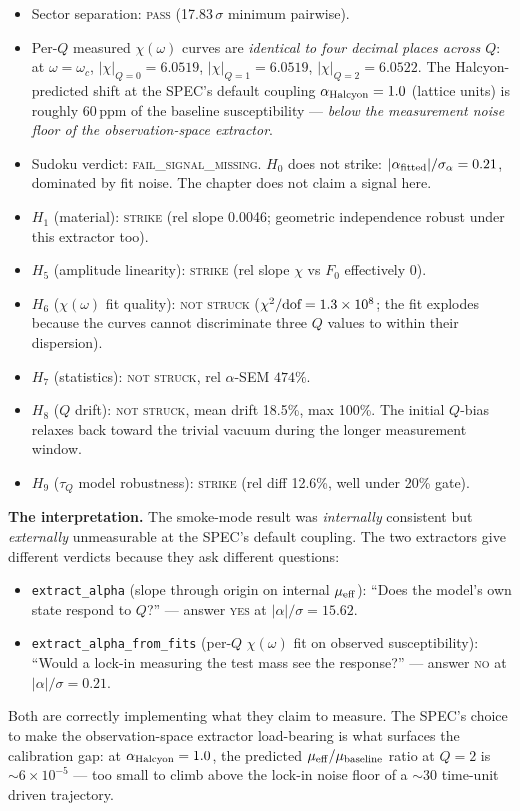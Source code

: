 \documentclass[12pt,a4paper]{article}
\theoremstyle{plain}
\theoremstyle{definition}
\theoremstyle{remark}
\begin{document}
\begin{itemize}
    \item Sector separation: \textsc{pass} (17.83\,$\sigma$ minimum pairwise).
    \item Per-$Q$ measured $\chi(\omega)$ curves are \emph{identical to four decimal places across $Q$}: at $\omega = \omega_c$, $|\chi|_{Q=0} = 6.0519$, $|\chi|_{Q=1} = 6.0519$, $|\chi|_{Q=2} = 6.0522$. The Halcyon-predicted shift at the SPEC's default coupling $\alpha_{\rm Halcyon} = 1.0$ (lattice units) is roughly $60\,$ppm of the baseline susceptibility --- \emph{below the measurement noise floor of the observation-space extractor}.
    \item Sudoku verdict: \textsc{fail\_signal\_missing}. $H_0$ does not strike: $|\alpha_{\rm fitted}|/\sigma_\alpha = 0.21$, dominated by fit noise. The chapter does not claim a signal here.
    \item $H_1$ (material): \textsc{strike} (rel slope 0.0046; geometric independence robust under this extractor too).
    \item $H_5$ (amplitude linearity): \textsc{strike} (rel slope $\chi$ vs $F_0$ effectively 0).
    \item $H_6$ ($\chi(\omega)$ fit quality): \textsc{not struck} ($\chi^2/\rm dof = 1.3\times 10^8$; the fit explodes because the curves cannot discriminate three $Q$ values to within their dispersion).
    \item $H_7$ (statistics): \textsc{not struck}, rel $\alpha$-SEM $474\%$.
    \item $H_8$ ($Q$ drift): \textsc{not struck}, mean drift 18.5\%, max 100\%. The initial $Q$-bias relaxes back toward the trivial vacuum during the longer measurement window.
    \item $H_9$ ($\tau_Q$ model robustness): \textsc{strike} (rel diff 12.6\%, well under 20\% gate).
\end{itemize}

\textbf{The interpretation.} The smoke-mode result was \emph{internally} consistent but \emph{externally} unmeasurable at the SPEC's default coupling. The two extractors give different verdicts because they ask different questions:
\begin{itemize}
    \item \texttt{extract\_alpha} (slope through origin on internal $\mu_{\rm eff}$): ``Does the model's own state respond to $Q$?'' --- answer \textsc{yes} at $|\alpha|/\sigma = 15.62$.
    \item \texttt{extract\_alpha\_from\_fits} (per-$Q$ $\chi(\omega)$ fit on observed susceptibility): ``Would a lock-in measuring the test mass see the response?'' --- answer \textsc{no} at $|\alpha|/\sigma = 0.21$.
\end{itemize}
Both are correctly implementing what they claim to measure. The SPEC's choice to make the observation-space extractor load-bearing is what surfaces the calibration gap: at $\alpha_{\rm Halcyon} = 1.0$, the predicted $\mu_{\rm eff}/\mu_{\rm baseline}$ ratio at $Q = 2$ is $\sim 6\times 10^{-5}$ --- too small to climb above the lock-in noise floor of a $\sim$30 time-unit driven trajectory.
\end{document}
